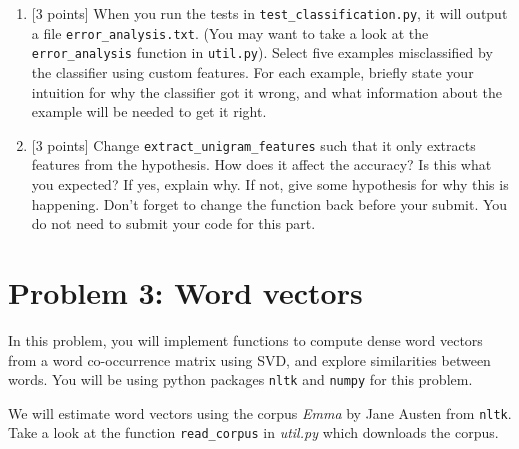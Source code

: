 \documentclass{article}
\theoremstyle{case}
\theoremstyle{definition}
\begin{document}
\begin{enumerate}
\begin{shaded}
        \end{shaded}

    \newpage
\item {[3 points]} When you run the tests in \texttt{test\_classification.py}, it will output a file \texttt{error\_analysis.txt}. (You may want to take a look at the \texttt{error\_analysis} function in \texttt{util.py}).
    Select five examples misclassified by the classifier using custom features.
        For each example, briefly state your intuition for why the classifier got it wrong, and what information about the example will be needed to get it right.
        \begin{shaded}
        \end{shaded}

    \newpage
\item {[3 points]} Change \texttt{extract\_unigram\_features} such that it only extracts features from the hypothesis.
    How does it affect the accuracy? Is this what you expected? If yes, explain why. If not, give some hypothesis for why this is happening.
    Don't forget to change the function back before your submit. You do not need to submit your code for this part.
        \begin{shaded}
        \end{shaded}

\end{enumerate}

\newpage
\section*{Problem 3: Word vectors}
In this problem, you will implement functions to compute dense word vectors from a word co-occurrence matrix using SVD, and explore similarities between words.
You will be using python packages \texttt{nltk} and \texttt{numpy} for this problem.

We will estimate word vectors using the corpus \textit{Emma} by Jane Austen from \texttt{nltk}. 
Take a look at the function \texttt{read\_corpus} in \textit{util.py} which downloads the corpus.
\end{document}
